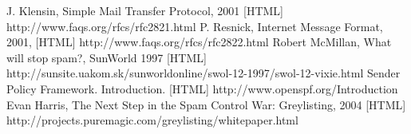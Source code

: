 \newpage
\begin{thebibliography}{99}
 J. Klensin, Simple Mail Transfer Protocol, 2001 [HTML] http://www.faqs.org/rfcs/rfc2821.html 
 P. Resnick, Internet Message Format, 2001, [HTML] http://www.faqs.org/rfcs/rfc2822.html
 Robert McMillan, What will stop spam?, SunWorld 1997 [HTML] http://sunsite.uakom.sk/sunworldonline/swol-12-1997/swol-12-vixie.html
 Sender Policy Framework. Introduction.  [HTML] http://www.openspf.org/Introduction
 Evan Harris, The Next Step in the Spam Control War: Greylisting, 2004 [HTML] http://projects.puremagic.com/greylisting/whitepaper.html

\end{thebibliography}
